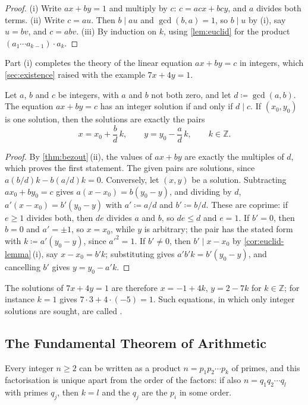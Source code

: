 \begin{proof}
(i) Write $ax+by=1$ and multiply by $c$: $c=acx+bcy$, and $a$ divides both terms. (ii) Write $c=au$. Then $b\mid au$ and $\gcd(b,a)=1$, so $b\mid u$ by (i), say $u=bv$, and $c=abv$. (iii) By induction on $k$, using \cref{lem:euclid} for the product $(a_1\cdots a_{k-1})\cdot a_k$.
\end{proof}

Part (i) completes the theory of the linear equation $ax+by=c$ in integers, which \cref{sec:existence} raised with the example $7x+4y=1$.

\begin{proposition}
\label{prop:diophantine}
Let $a$, $b$ and $c$ be integers, with $a$ and $b$ not both zero, and let $d\coloneqq\gcd(a,b)$. The equation $ax+by=c$ has an integer solution if and only if $d\mid c$. If $(x_0,y_0)$ is one solution, then the solutions are exactly the pairs
\[
x=x_0+\frac bd\,k,\qquad y=y_0-\frac ad\,k,\qquad k\in\mathbb Z .
\]
\end{proposition}

\begin{proof}
By \cref{thm:bezout}\,(ii), the values of $ax+by$ are exactly the multiples of $d$, which proves the first statement. The given pairs are solutions, since $a(b/d)k-b(a/d)k=0$. Conversely, let $(x,y)$ be a solution. Subtracting $ax_0+by_0=c$ gives $a(x-x_0)=b(y_0-y)$, and dividing by $d$, $a'(x-x_0)=b'(y_0-y)$ with $a'\coloneqq a/d$ and $b'\coloneqq b/d$. These are coprime: if $e\ge1$ divides both, then $de$ divides $a$ and $b$, so $de\le d$ and $e=1$. If $b'=0$, then $b=0$ and $a'=\pm1$, so $x=x_0$, while $y$ is arbitrary; the pair has the stated form with $k\coloneqq a'(y_0-y)$, since $a'^2=1$. If $b'\ne0$, then $b'\mid x-x_0$ by \cref{cor:euclid-lemma}\,(i), say $x-x_0=b'k$; substituting gives $a'b'k=b'(y_0-y)$, and cancelling $b'$ gives $y=y_0-a'k$.
\end{proof}

The solutions of $7x+4y=1$ are therefore $x=-1+4k$, $y=2-7k$ for $k\in\mathbb Z$; for instance $k=1$ gives $7\cdot3+4\cdot(-5)=1$. Such equations, in which only integer solutions are sought, are called .

\subsection{The Fundamental Theorem of Arithmetic}

\begin{theorem}
\label{thm:fta-arith}
Every integer $n\ge2$ can be written as a product $n=p_1p_2\cdots p_k$ of primes, and this factorisation is unique apart from the order of the factors: if also $n=q_1q_2\cdots q_l$ with primes $q_j$, then $k=l$ and the $q_j$ are the $p_i$ in some order.
\end{theorem}

